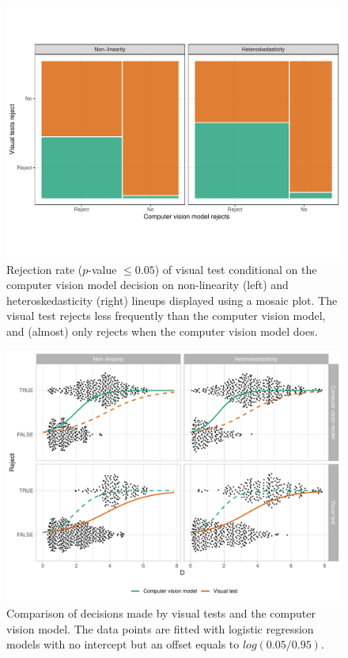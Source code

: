 \documentclass[]{interact}
\theoremstyle{plain}%
\theoremstyle{definition}
\theoremstyle{remark}
\begin{document}
\begin{figure}[!h]

{\centering \includegraphics[width=1\linewidth]{paper_files/figure-latex/human-mosaic-1} 

}

\caption{Rejection rate ($p$-value $\leq0.05$) of visual test conditional on the computer vision model decision on non-linearity (left) and heteroskedasticity (right) lineups displayed using a mosaic plot. The visual test rejects less frequently than the computer vision model, and (almost) only rejects when the computer vision model does.}\label{fig:human-mosaic}
\end{figure}

\begin{figure}[!h]

{\centering \includegraphics[width=1\linewidth]{paper_files/figure-latex/power-1} 

}

\caption{Comparison of decisions made by visual tests and the computer vision model. The data points are fitted with logistic regression models with no intercept but an offset equals to $log(0.05/0.95)$.}\label{fig:power}
\end{figure}
\end{document}
